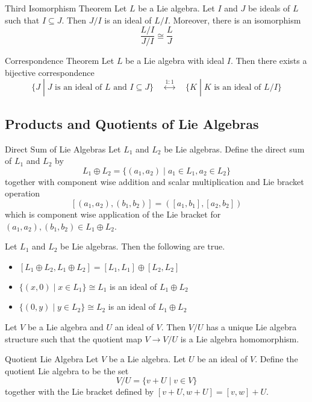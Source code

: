 \documentclass[a4paper]{article}
\begin{document}
\begin{thm}{Third Isomorphism Theorem}{} Let $L$ be a Lie algebra. Let $I$ and $J$ be ideals of $L$ such that $I\subseteq J$. Then $J/I$ is an ideal of $L/I$. Moreover, there is an isomorphism $$\frac{L/I}{J/I}\cong\frac{L}{J}$$
\end{thm}

\begin{thm}{Correspondence Theorem}{} Let $L$ be a Lie algebra with ideal $I$. Then there exists a bijective correspondence $$\{J\;|\;J\text{ is an ideal of }L\text{ and }I\subseteq J\}\;\;\;\;\overset{1:1}{\longleftrightarrow}\;\;\;\;\{K\;|\;K\text{ is an ideal of }L/I\}$$
\end{thm}

\subsection{Products and Quotients of Lie Algebras}
\begin{defn}{Direct Sum of Lie Algebras}{} Let $L_1$ and $L_2$ be Lie algebras. Define the direct sum of $L_1$ and $L_2$ by $$L_1\oplus L_2=\{(a_1,a_2)\;|\;a_1\in L_1,a_2\in L_2\}$$ together with component wise addition and scalar multiplication and Lie bracket operation $$[(a_1,a_2),(b_1,b_2)]=([a_1,b_1],[a_2,b_2])$$ which is component wise application of the Lie bracket for $(a_1,a_2),(b_1,b_2)\in L_1\oplus L_2$. 
\end{defn}

\begin{prp}{}{} Let $L_1$ and $L_2$ be Lie algebras. Then the following are true. 
\begin{itemize}
\item $[L_1\oplus L_2,L_1\oplus L_2]=[L_1,L_1]\oplus[L_2,L_2]$
\item $\{(x,0)\;|\;x\in L_1\}\cong L_1$ is an ideal of $L_1\oplus L_2$
\item $\{(0,y)\;|\;y\in L_2\}\cong L_2$ is an ideal of $L_1\oplus L_2$
\end{itemize}
\end{prp}

\begin{prp}{}{} Let $V$ be a Lie algebra and $U$ an ideal of $V$. Then $V/U$ has a unique Lie algebra structure such that the quotient map $V\to V/U$ is a Lie algebra homomorphism. 
\end{prp}

\begin{defn}{Quotient Lie Algebra}{} Let $V$ be a Lie algebra. Let $U$ be an ideal of $V$. Define the quotient Lie algebra to be the set $$V/U=\{v+U\;|\;v\in V\}$$ together with the Lie bracket defined by $[v+U,w+U]=[v,w]+U$. 
\end{defn}
\end{document}
